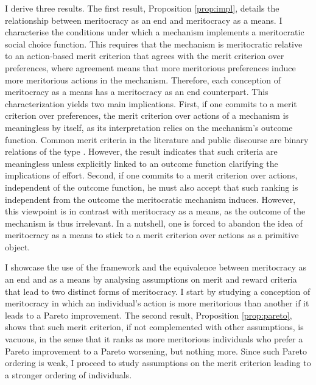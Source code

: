 I derive three results. The first result, Proposition \ref{prop:impl}, details the relationship between meritocracy as an end and meritocracy as a means. I characterise the conditions under which a mechanism implements a meritocratic social choice function. This requires that the mechanism is meritocratic relative to an action-based merit criterion that agrees with the merit criterion over preferences, where agreement means that more meritorious preferences induce more meritorious actions in the mechanism. Therefore, each conception of meritocracy as a means has a meritocracy as an end counterpart. This characterization yields two main implications. First, if one commits to a merit criterion over preferences, the merit criterion over actions of a mechanism is meaningless by itself, as its interpretation relies on the mechanism's outcome function. Common merit criteria in the literature and public discourse are binary relations of the type . However, the result indicates that such criteria are meaningless unless explicitly linked to an outcome function clarifying the implications of effort. Second, if one commits to a merit criterion over actions, independent of the outcome function, he must also accept that such ranking is independent from the outcome the meritocratic mechanism induces. However, this viewpoint is in contrast with meritocracy as a means, as the outcome of the mechanism is thus irrelevant. In a nutshell, one is forced to abandon the idea of meritocracy as a means to stick to a merit criterion over actions as a primitive object.

I showcase the use of the framework and the equivalence between meritocracy as an end and as a means by analysing assumptions on merit and reward criteria that lead to two distinct forms of meritocracy. I start by studying a conception of meritocracy in which an individual's action is more meritorious than another if it leads to a Pareto improvement. The second result, Proposition \ref{prop:pareto}, shows that such merit criterion, if not complemented with other assumptions, is vacuous, in the sense that it ranks as more meritorious individuals who prefer a Pareto improvement to a Pareto worsening, but nothing more. Since such Pareto ordering is weak, I proceed to study assumptions on the merit criterion leading to a stronger ordering of individuals.

